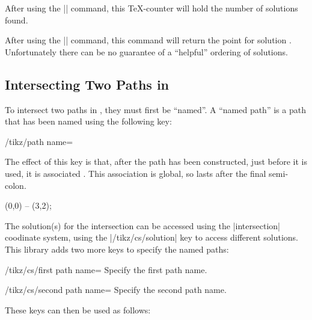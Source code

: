 \begin{command}{\pgfintersectionsolutions}
  After using the |\pgfintersectionofpaths| command, this \TeX-counter
  will hold the number of solutions found.
\end{command}

\begin{command}{\pgfpointintersectionsolution{}}
  After using the |\pgfintersectionofpaths| command, this command
  will return the point for solution . Unfortunately
  there can be no guarantee of a ``helpful'' ordering of solutions.
\end{command}

\subsection{Intersecting Two Paths in \tikzname}

  To intersect two paths in \tikzname, they must first be
  ``named''. A ``named path'' is a path that has been named using 
  the following key:
    
\begin{key}{/tikz/path name=}

  The effect of this key is that, after the path has been constructed,
  just before it is used, it is associated . This 
  association is global, so lasts after the final semi-colon. 
  
\begin{codeexample}
\path [name=straight line] (0,0) -- (3,2);
\end{codeexample}
\end{key}

  The solution(s) for the intersection can be accessed using the
  |intersection| coodinate system, using the |/tikz/cs/solution| key
  to access different solutions. This library adds two more keys
  to specify the named paths:

\begin{key}{/tikz/cs/first path name=}
  Specify the first path name.
\end{key}

\begin{key}{/tikz/cs/second path name=}
  Specify the second path name.
\end{key}
  
  These keys can then be used as follows:
  
\begin{codeexample}[]
\end{codeexample}

